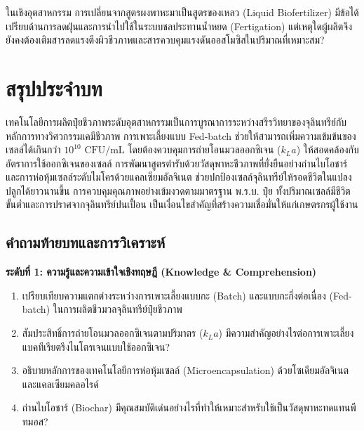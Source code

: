 \begin{insight}
ในเชิงอุตสาหกรรม การเปลี่ยนจากสูตรผงพาหะมาเป็นสูตรของเหลว (Liquid Biofertilizer) มีข้อได้เปรียบด้านการลดฝุ่นและการนำไปใช้ในระบบชลประทานน้ำหยด (Fertigation) แต่เหตุใดผู้ผลิตจึงยังคงต้องเติมสารลดแรงตึงผิวชีวภาพและสารควบคุมแรงดันออสโมซิสในปริมาณที่เหมาะสม?
\end{insight}

\section*{สรุปประจำบท}

เทคโนโลยีการผลิตปุ๋ยชีวภาพระดับอุตสาหกรรมเป็นการบูรณาการระหว่างสรีรวิทยาของจุลินทรีย์กับหลักการทางวิศวกรรมเคมีชีวภาพ การเพาะเลี้ยงแบบ Fed-batch ช่วยให้สามารถเพิ่มความเข้มข้นของเซลล์ได้เกินกว่า $10^{10}\text{ CFU/mL}$ โดยต้องควบคุมการถ่ายโอนมวลออกซิเจน ($k_L a$) ให้สอดคล้องกับอัตราการใช้ออกซิเจนของเซลล์ การพัฒนาสูตรตำรับด้วยวัสดุพาหะชีวภาพที่ยั่งยืนอย่างถ่านไบโอชาร์และการห่อหุ้มเซลล์ระดับไมโครด้วยแคลเซียมอัลจิเนต ช่วยปกป้องเซลล์จุลินทรีย์ให้รอดชีวิตในแปลงปลูกได้ยาวนานขึ้น การควบคุมคุณภาพอย่างเข้มงวดตามมาตรฐาน พ.ร.บ. ปุ๋ย ทั้งปริมาณเซลล์มีชีวิตขั้นต่ำและการปราศจากจุลินทรีย์ปนเปื้อน เป็นเงื่อนไขสำคัญที่สร้างความเชื่อมั่นให้แก่เกษตรกรผู้ใช้งาน

\subsection*{คำถามท้ายบทและการวิเคราะห์}

\noindent \textbf{ระดับที่ 1: ความรู้และความเข้าใจเชิงทฤษฎี (Knowledge \& Comprehension)}
\begin{enumerate}
    \item เปรียบเทียบความแตกต่างระหว่างการเพาะเลี้ยงแบบกะ (Batch) และแบบกะกึ่งต่อเนื่อง (Fed-batch) ในการผลิตชีวมวลจุลินทรีย์ปุ๋ยชีวภาพ
    \item สัมประสิทธิ์การถ่ายโอนมวลออกซิเจนตามปริมาตร ($k_L a$) มีความสำคัญอย่างไรต่อการเพาะเลี้ยงแบคทีเรียตรึงไนโตรเจนแบบใช้ออกซิเจน?
    \item อธิบายหลักการของเทคโนโลยีการห่อหุ้มเซลล์ (Microencapsulation) ด้วยโซเดียมอัลจิเนตและแคลเซียมคลอไรด์
    \item ถ่านไบโอชาร์ (Biochar) มีคุณสมบัติเด่นอย่างไรที่ทำให้เหมาะสำหรับใช้เป็นวัสดุพาหะทดแทนพีทมอส?
\end{enumerate}

